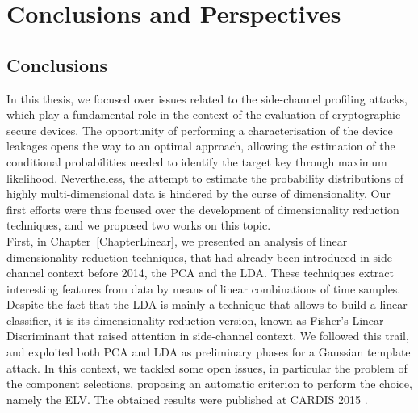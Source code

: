 
\chapter{Conclusions and Perspectives} %

\label{ChapterConclusions}



\section{Conclusions}
In this thesis, we focused over issues related to the side-channel profiling attacks, which play a fundamental role in the context of the evaluation of cryptographic secure devices. The opportunity of performing a characterisation of the device leakages opens the way to an optimal approach, allowing the estimation of the conditional probabilities needed to identify the target key through maximum likelihood. Nevertheless, the attempt to estimate the probability distributions of highly multi-dimensional data is hindered by the curse of dimensionality. Our first efforts were thus
 focused over the development of dimensionality reduction techniques, and we proposed two works on this topic.\\
 
First, in Chapter~\ref{ChapterLinear}, we presented an analysis of linear dimensionality reduction techniques, that had already been introduced in side-channel context before 2014, the PCA and the LDA. These techniques extract interesting features from data by means of linear combinations of time samples. Despite the fact that the LDA is mainly a technique that allows to build a linear classifier, it is its dimensionality reduction version, known as Fisher's Linear Discriminant that raised attention in side-channel context. We followed this trail, and exploited both PCA and LDA as preliminary phases for a Gaussian template attack. In this context, we tackled some open issues, in particular the problem of the component selections, proposing an automatic criterion to perform the choice, namely the ELV.  The obtained results were published at CARDIS 2015 \cite{Cagli2016}.\\

